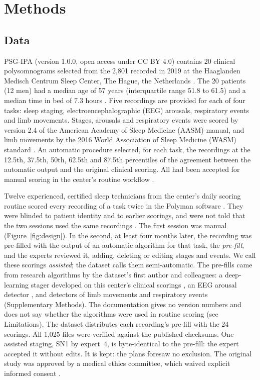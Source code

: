 \documentclass[11pt]{article}
\begin{document}
\section{Methods}

\subsection{Data}

PSG-IPA (version 1.0.0, open access under CC BY 4.0) contains 20 clinical polysomnograms selected from the 2,801
recorded in 2019 at the Haaglanden Medisch Centrum Sleep Center, The Hague, the Netherlands
\citep{psgipa2026,alvarezestevez2022,pollard2026,goldberger2000}. The 20 patients (12 men) had a median age of 57 years
(interquartile range 51.8 to 61.5) and a median time in bed of 7.3 hours \citep{psgipa2026}. Five recordings are
provided for each of four tasks: sleep staging, electroencephalographic (EEG) arousals, respiratory events and limb
movements. Stages, arousals and respiratory events were scored by version 2.4 of the American Academy of Sleep
Medicine (AASM) manual, and limb movements by the 2016 World Association of Sleep Medicine (WASM) standard
\citep{ferri2016}. An automatic procedure selected, for
each task, the recordings at the 12.5th, 37.5th, 50th, 62.5th and 87.5th percentiles of the agreement between the
automatic output and the original clinical scoring. All had been accepted for manual scoring in the center's routine
workflow \citep{alvarezestevez2022,psgipa2026}.

Twelve experienced, certified sleep technicians from the center's daily scoring routine scored every recording of a
task twice in the Polyman software \citep{kemp2007}. They were blinded to patient identity and to earlier scorings,
and were not told that the two sessions used the same recordings \citep{alvarezestevez2022}. The first session was manual (Figure~\ref{fig:design}). In the second, at least four months later, the recording was pre-filled with the output of an automatic
algorithm for that task, the \emph{pre-fill}, and the experts reviewed it, adding, deleting or editing stages and
events. We call these scorings
\emph{assisted}; the dataset calls them semi-automatic. The pre-fills came from research algorithms by the dataset's
first author and colleagues: a deep-learning stager developed on this center's clinical scorings
\citep{alvarezestevez2021}, an EEG arousal detector \citep{alvarezestevez2019}, and detectors
of limb movements and respiratory events (Supplementary Methods). The documentation gives no version numbers and does not say whether the algorithms were used in routine
scoring (see Limitations). The dataset distributes each recording's
pre-fill with the 24 scorings. All 1,025 files were verified against the published checksums. One assisted staging,
SN1 by expert~4, is byte-identical to the pre-fill: the expert accepted it without edits. It is kept: the plans foresaw no exclusion. The original study was
approved by a medical ethics committee, which waived explicit informed consent \citep{alvarezestevez2022}.
\end{document}
